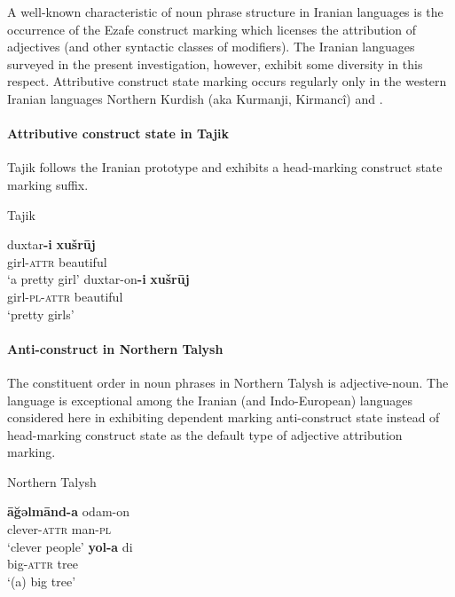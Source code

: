 A well-known characteristic of noun phrase structure in Iranian languages is the occurrence of the Ezafe construct marking which licenses the attribution of adjectives (and other syntactic classes of modifiers). The Iranian languages surveyed in the present investigation, however, exhibit some diversity in this respect. Attributive construct state marking occurs regularly only in the western Iranian languages Northern Kurdish (aka Kurmanji, Kirmancî) and .

\paragraph{Attributive construct state in Tajik}
Tajik follows the Iranian prototype and exhibits a head-marking construct state marking suffix.
\begin{exe}
\ex \rm{Tajik \citep{rastorgueva1963}}
\begin{xlist}
\ex
\gll	duxtar\textbf{-i} \textbf{xušrūj}\\
	girl-\textsc{attr} beautiful\\
\glt	‘a pretty girl’
\ex
\gll	duxtar-on\textbf{-i} \textbf{xušrūj}\\
	girl-\textsc{pl}-\textsc{attr} beautiful\\
\glt	‘pretty girls’
\end{xlist}
\end{exe}

\paragraph{Anti-construct in Northern Talysh} \label{talysh synchr}
The constituent order in noun phrases in Northern Talysh is adjective-noun. The language is exceptional among the Iranian (and Indo-European) languages considered here in exhibiting dependent marking anti-construct state instead of head-marking construct state as the default type of adjective attribution marking.
\begin{exe}
\ex \rm{Northern Talysh \citep[27]{schulze2000}}%
\begin{xlist}
\ex
\gll	\textbf{āğəlmānd-a} odam-on\\
	clever-\textsc{attr} man-\textsc{pl}\\
\glt	‘clever people’
\ex
\gll	\textbf{yol-a} di\\
	big-\textsc{attr} tree\\
\glt	‘(a) big tree’
\end{xlist}
\end{exe}

